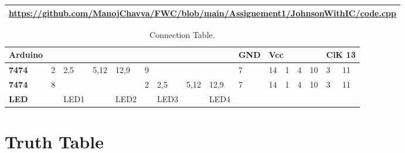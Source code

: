 \documentclass[journal,12pt,twocolumn]{IEEEtran}
\begin{document}
\newpage

\begin{table}[h]
\large
\centering
\begin{tabular}{|l|}
\hline

\url{https://github.com/ManojChavva/FWC/blob/main/Assignement1/JohnsonWithIC/code.cpp} \\
\hline

\end{tabular}

\end{table}


\begin{table}[h]
\large
\centering

\begin{tabular}{|l|l|l|l|l|l|l|l|l|l|llll|ll|}
\hline
\textbf{Arduino} &   &      &      &      &   &      &      &      & GND & \multicolumn{4}{l|}{Vcc}                                                       & \multicolumn{2}{l|}{ClK  13} \\ \hline
\textbf{7474}    & 2 & 2,5  & 5,12 & 12,9 & 9 &      &      &      & 7   & \multicolumn{1}{l|}{14} & \multicolumn{1}{l|}{1} & \multicolumn{1}{l|}{4} & 10 & \multicolumn{1}{l|}{3}  & 11 \\ \hline
\textbf{7474}    & 8 &      &      &      & 2 & 2,5  & 5,12 & 12,9 & 7   & \multicolumn{1}{l|}{14} & \multicolumn{1}{l|}{1} & \multicolumn{1}{l|}{4} & 10 & \multicolumn{1}{l|}{3}  & 11 \\ \hline
\textbf{LED}     &   & LED1 &      & LED2 &   & LED3 &      & LED4 &     & \multicolumn{1}{l|}{}   & \multicolumn{1}{l|}{}  & \multicolumn{1}{l|}{}  &    & \multicolumn{1}{l|}{}   &    \\ \hline
\end{tabular}

\caption{Connection Table.}
\label{table:1}
\end{table}


\section{Truth Table}
\end{document}
